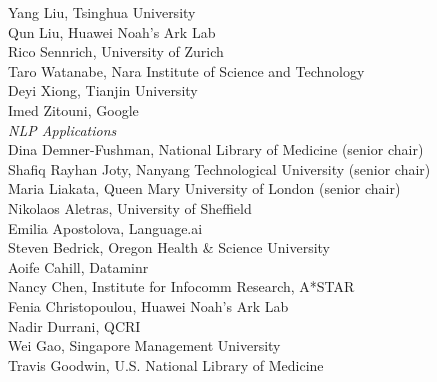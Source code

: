 \hspace*{0.2in} Yang Liu, Tsinghua University\\
\hspace*{0.2in} Qun Liu, Huawei Noah's Ark Lab\\
\hspace*{0.2in} Rico Sennrich, University of Zurich\\
\hspace*{0.2in} Taro Watanabe, Nara Institute of Science and Technology\\
\hspace*{0.2in} Deyi Xiong, Tianjin University\\
\hspace*{0.2in} Imed Zitouni, Google\\

\emph{NLP Applications} \\
\hspace*{0.2in} Dina Demner-Fushman, National Library of Medicine (senior chair)\\
\hspace*{0.2in} Shafiq Rayhan Joty, Nanyang Technological University (senior chair)\\
\hspace*{0.2in} Maria Liakata, Queen Mary University of London (senior chair)\\
\hspace*{0.2in} Nikolaos Aletras, University of Sheffield\\
\hspace*{0.2in} Emilia Apostolova, Language.ai\\
\hspace*{0.2in} Steven Bedrick, Oregon Health & Science University\\
\hspace*{0.2in} Aoife Cahill, Dataminr\\
\hspace*{0.2in} Nancy Chen, Institute for Infocomm Research, A*STAR\\
\hspace*{0.2in} Fenia Christopoulou, Huawei Noah's Ark Lab\\
\hspace*{0.2in} Nadir Durrani, QCRI\\
\hspace*{0.2in} Wei Gao, Singapore Management University\\
\hspace*{0.2in} Travis Goodwin, U.S. National Library of Medicine\\
